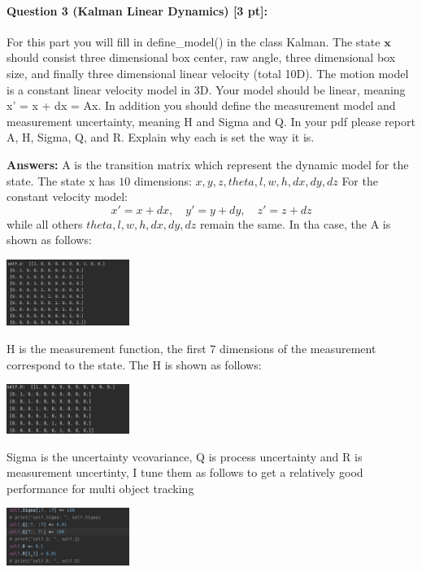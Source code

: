 \documentclass[11pt]{article}
\begin{document}
\paragraph{Question 3 (Kalman Linear Dynamics) [3 pt]:}
For this part you will fill in define\_model() in the class Kalman. The state $\mathbf{x}$ should consist three dimensional box center, raw angle, three dimensional box size, and finally three dimensional linear velocity (total 10D). The motion model is a constant linear velocity model in 3D. Your model should be linear, meaning x' = x + dx = Ax. In addition you should define the measurement model and measurement uncertainty, meaning H and Sigma and Q. In your pdf please report A, H, Sigma, Q, and R. Explain why each is set the way it is.

\textbf{Answers:} A is the transition matrix which represent the dynamic model for the state. The state x has $10$ dimensions: $x, y, z, theta, l, w, h, dx, dy, dz$
For the constant velocity model: 
\[x' = x + dx, \quad y' = y + dy, \quad z' = z + dz\]
while all others $theta, l, w, h, dx, dy, dz$ remain the same.
In tha case, the A is shown as follows:
\begin{center}
    \includegraphics[width=0.3\textwidth]{./fig/Q3_A.png}
\end{center}

H is the measurement function, the first 7 dimensions of the measurement correspond to the state. The H is shown as follows:
\begin{center}
    \includegraphics[width=0.3\textwidth]{./fig/Q3_H.png}
\end{center}

Sigma is the uncertainty vcovariance, Q is process uncertainty and R is measurement uncertinty, I tune them as follows to get a relatively good performance for multi object tracking
\begin{center}
    \includegraphics[width=0.3\textwidth]{./fig/Q3_para.png}
\end{center}
\end{document}
